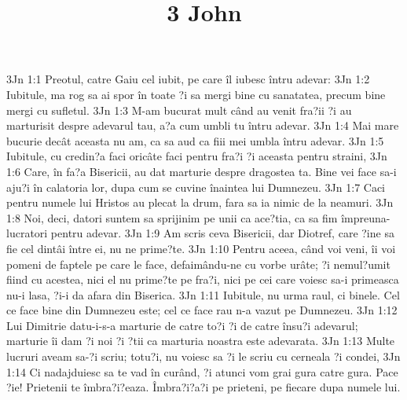 

\title{3 John}

3Jn 1:1  Preotul, catre Gaiu cel iubit, pe care îl iubesc întru adevar:
3Jn 1:2  Iubitule, ma rog sa ai spor în toate ?i sa mergi bine cu sanatatea, precum bine mergi cu sufletul.
3Jn 1:3  M-am bucurat mult când au venit fra?ii ?i au marturisit despre adevarul tau, a?a cum umbli tu întru adevar.
3Jn 1:4  Mai mare bucurie decât aceasta nu am, ca sa aud ca fiii mei umbla întru adevar.
3Jn 1:5  Iubitule, cu credin?a faci oricâte faci pentru fra?i ?i aceasta pentru straini,
3Jn 1:6  Care, în fa?a Bisericii, au dat marturie despre dragostea ta. Bine vei face sa-i aju?i în calatoria lor, dupa cum se cuvine înaintea lui Dumnezeu.
3Jn 1:7  Caci pentru numele lui Hristos au plecat la drum, fara sa ia nimic de la neamuri.
3Jn 1:8  Noi, deci, datori suntem sa sprijinim pe unii ca ace?tia, ca sa fim împreuna-lucratori pentru adevar.
3Jn 1:9  Am scris ceva Bisericii, dar Diotref, care ?ine sa fie cel dintâi între ei, nu ne prime?te.
3Jn 1:10  Pentru aceea, când voi veni, îi voi pomeni de faptele pe care le face, defaimându-ne cu vorbe urâte; ?i nemul?umit fiind cu acestea, nici el nu prime?te pe fra?i, nici pe cei care voiesc sa-i primeasca nu-i lasa, ?i-i da afara din Biserica.
3Jn 1:11  Iubitule, nu urma raul, ci binele. Cel ce face bine din Dumnezeu este; cel ce face rau n-a vazut pe Dumnezeu.
3Jn 1:12  Lui Dimitrie datu-i-s-a marturie de catre to?i ?i de catre însu?i adevarul; marturie îi dam ?i noi ?i ?tii ca marturia noastra este adevarata.
3Jn 1:13  Multe lucruri aveam sa-?i scriu; totu?i, nu voiesc sa ?i le scriu cu cerneala ?i condei,
3Jn 1:14  Ci nadajduiesc sa te vad în curând, ?i atunci vom grai gura catre gura. Pace ?ie! Prietenii te îmbra?i?eaza. Îmbra?i?a?i pe prieteni, pe fiecare dupa numele lui.


